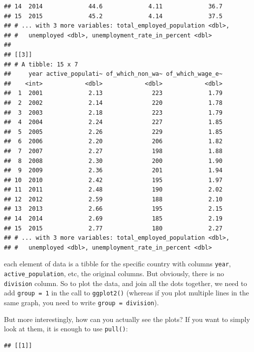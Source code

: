 \documentclass[]{gitbook}
\newenvironment{Shaded}{\begin{snugshade}}{\end{snugshade}}
\newcommand{\KeywordTok}[1]{\textcolor[rgb]{0.13,0.29,0.53}{\textbf{#1}}}
\newcommand{\NormalTok}[1]{#1}
\newcommand{\OperatorTok}[1]{\textcolor[rgb]{0.81,0.36,0.00}{\textbf{#1}}}
\newcommand{\StringTok}[1]{\textcolor[rgb]{0.31,0.60,0.02}{#1}}
\begin{document}
\begin{verbatim}
## 14  2014             44.6             4.11             36.7
## 15  2015             45.2             4.14             37.5
## # ... with 3 more variables: total_employed_population <dbl>,
## #   unemployed <dbl>, unemployment_rate_in_percent <dbl>
## 
## [[3]]
## # A tibble: 15 x 7
##     year active_populati~ of_which_non_wa~ of_which_wage_e~
##    <int>            <dbl>            <dbl>            <dbl>
##  1  2001             2.13              223             1.79
##  2  2002             2.14              220             1.78
##  3  2003             2.18              223             1.79
##  4  2004             2.24              227             1.85
##  5  2005             2.26              229             1.85
##  6  2006             2.20              206             1.82
##  7  2007             2.27              198             1.88
##  8  2008             2.30              200             1.90
##  9  2009             2.36              201             1.94
## 10  2010             2.42              195             1.97
## 11  2011             2.48              190             2.02
## 12  2012             2.59              188             2.10
## 13  2013             2.66              195             2.15
## 14  2014             2.69              185             2.19
## 15  2015             2.77              180             2.27
## # ... with 3 more variables: total_employed_population <dbl>,
## #   unemployed <dbl>, unemployment_rate_in_percent <dbl>
\end{verbatim}

each element of data is a tibble for the specific country with columns \texttt{year}, \texttt{active\_population},
etc, the original columns. But obviously, there is no \texttt{division} column. So to plot the data, and
join all the dots together, we need to add \texttt{group\ =\ 1} in the call to \texttt{ggplot2()} (whereas if you
plot multiple lines in the same graph, you need to write \texttt{group\ =\ division}).

But more interestingly, how can you actually see the plots? If you want to simply look at them, it
is enough to use \texttt{pull()}:

\begin{Shaded}
\end{Shaded}

\begin{verbatim}
## [[1]]
\end{verbatim}
\end{document}
